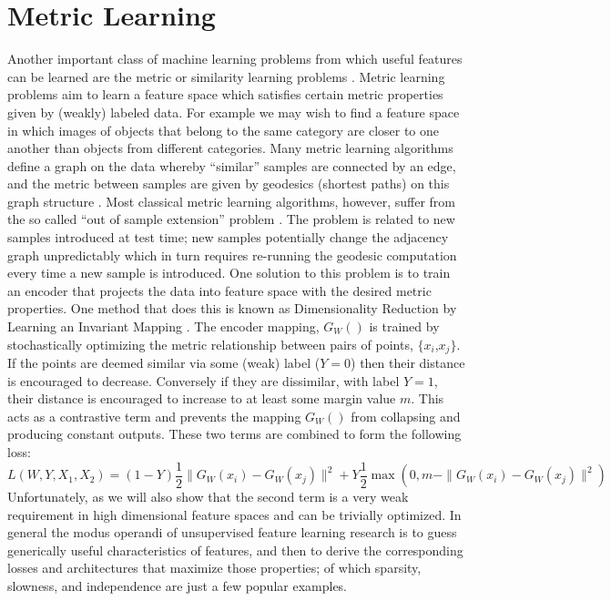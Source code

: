 \section{Metric Learning}
Another important class of machine learning problems from which useful features
can be learned are the metric or similarity learning problems
\cite{tenenbaum2000,DrLIM}. Metric learning problems aim to learn a feature
space which satisfies certain metric properties given by (weakly) labeled data.
For example we may wish to find a feature space in which images of objects that
belong to the same category are closer to one another than objects from
different categories. Many metric learning algorithms define a graph on the
data whereby ``similar'' samples are connected by an edge, and the metric
between samples are given by geodesics (shortest paths) on this graph structure
\cite{tenenbaum2000, coifman2006}. Most classical metric learning algorithms,
however, suffer from the so called ``out of sample extension'' problem
\cite{bengio2004out,coifman2006geometric}. The problem is related to new samples 
introduced at test time; new samples potentially change the adjacency graph 
unpredictably which in turn requires re-running the geodesic computation every
time a new sample is introduced. One solution to this problem is to train an
encoder that projects the data into feature space with the desired metric
properties. One method that does this is known as Dimensionality Reduction by
Learning an Invariant Mapping \cite{DrLIM}. The encoder mapping, $G_W()$ is
trained by stochastically optimizing the metric relationship between pairs of
points, $\{x_i$,$x_j\}$.  If the points are deemed similar via some (weak)
label ($Y=0$) then their distance is encouraged to decrease. Conversely if they
are dissimilar, with label $Y=1$, their distance is encouraged to increase to
at least some margin value $m$. This acts as a contrastive term and prevents 
the mapping $G_W()$ from collapsing and producing constant outputs. These two 
terms are combined to form the following loss:            
\begin{equation} 
L(W,Y,X_1,X_2) = (1-Y)\frac{1}{2}\|G_W(x_i)-G_W(x_j)\|^2 + Y \frac{1}{2}\max(0,m-\|G_W(x_i)-G_W(x_j)\|^2)  
\end{equation}  
Unfortunately, as we will also show that the second term is a very weak
requirement in high dimensional feature spaces and can be trivially 
optimized. 
\newline
\newline
\indent 
In general the modus operandi of unsupervised feature learning research is to guess 
generically useful characteristics of features, and then to derive the corresponding 
losses and architectures that maximize those properties; of which sparsity, slowness, 
and independence are just a few popular examples.      
